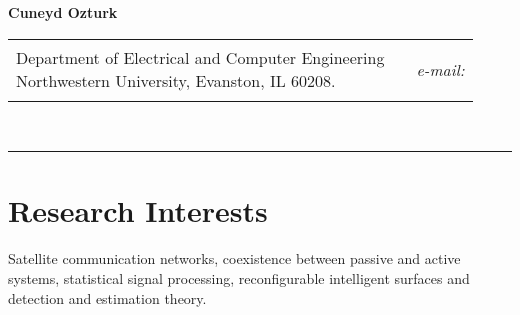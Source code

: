 

\newcommand{\textapprox}{\raisebox{0.5ex}{\texttildelow}}



\newlength{\rcollength}\setlength{\rcollength}{2.5in}%
\newlength{\spacewidth}\setlength{\spacewidth}{20pt}
\newcommand\spacechar{$|$}

{\hspace*{-\marginparsep minus \marginparwidth}%
         \begin{minipage}[t]{\textwidth+\marginparwidth+\marginparsep}%
             {\large \bfseries \hspace*{\fill}Cuneyd Ozturk\hspace*{\fill}}\\
             {\small \begin{tabular}[t]{@{}p{\textwidth-\rcollength-\spacewidth}@{}p{\spacewidth}@{}p{\rcollength}}
                \parbox{\textwidth-\rcollength-\spacewidth}
                {Department of Electrical and Computer Engineering\\
                Northwestern University, Evanston, IL 60208.}
                & \parbox{\spacewidth}{ } &
                \parbox{\rcollength}{%
                \begin{flushright}
                \textit{e-mail:} 
                \end{flushright}}
             \end{tabular}}\\[-0.25\baselineskip]
             \rule{\columnwidth}{1pt}%
         \end{minipage}}



\section{Research Interests}
Satellite communication networks, coexistence between passive and active systems, statistical signal processing, reconfigurable intelligent surfaces and detection and estimation theory.
\blankline


